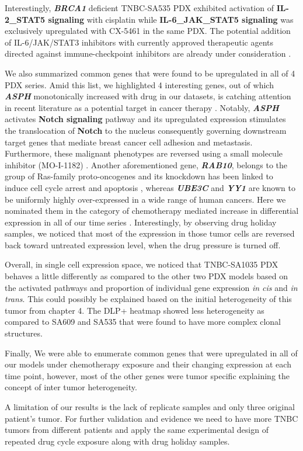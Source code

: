 \begin{itemize}
Interestingly, \textbf{\textit{BRCA1}} deficient TNBC-SA535 PDX exhibited activation of \textbf{IL-2\_STAT5 signaling} with cisplatin while \textbf{IL-6\_JAK\_STAT5 signaling} was exclusively upregulated with CX-5461 in the same PDX. The potential addition of IL-6/JAK/STAT3 inhibitors with currently approved therapeutic agents directed against immune-checkpoint inhibitors are already under consideration \cite{johnson2018targeting}.

We also summarized common genes that were found to be upregulated in all of 4 PDX series. Amid this list, we highlighted 4 interesting genes, out of which \textbf{\textit{ASPH}} monotonically increased with drug in our datasets, is catching attention in recent literature as a potential target in cancer therapy \cite{barboro2020aspartate, li2018expression, hou2018recent, kanwal2020aspartate}. Notably, \textbf{\textit{ASPH}} activates \textbf{Notch signaling} pathway and its upregulated expression stimulates the translocation of \textbf{Notch} to the nucleus consequently governing downstream target genes that mediate breast cancer cell adhesion and metastasis. Furthermore, these malignant phenotypes are reversed using a small molecule inhibitor (MO-I-1182) \cite{lin2019asph}. Another aforementioned gene, \textbf{\textit{RAB10}}, belongs to the group of Ras-family proto-oncogenes and its knockdown has been linked to induce cell cycle arrest and apoptosis \cite{zhou2018down}, whereas \textbf{\textit{UBE3C}} and \textbf{\textit{YY1}} are known to be uniformly highly over-expressed in a wide range of human cancers.  Here we nominated them in the category of chemotherapy mediated increase in  differential expression in all of our time series \cite{pan2015ubiquitin, zhang2020ube3c, meliala2020biological, wan2012yin}. Interestingly, by observing drug holiday samples, we noticed that most of the expression in those tumor cells are reversed back toward untreated expression level, when the drug pressure is turned off.

Overall, in single cell expression space, we noticed that TNBC-SA1035 PDX behaves a little differently as compared to the other two PDX models based on the activated pathways and proportion of individual gene expression \textit{in cis} and \textit{in trans}. This could possibly be explained based on the initial heterogeneity of this tumor from chapter 4. The DLP+ heatmap showed less heterogeneity as compared to SA609 and SA535 that were found to have more complex clonal structures.

Finally, We were able to enumerate common genes that were upregulated in all of our models under chemotherapy exposure and their changing expression at each time point, however, most of the other genes were tumor specific explaining the concept of inter tumor heterogeneity.
 
A limitation of our results is the lack of replicate samples and only three original patient's tumor. For further validation and evidence
we need to have more TNBC tumors from different patients and apply the same experimental design of repeated drug cycle exposure along with drug holiday samples.
\end{itemize}



